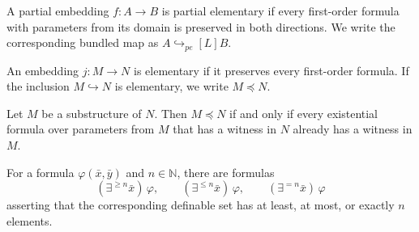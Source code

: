 \begin{definition}
\label{def:partial-elementary-embedding}
\leanok
{}
A partial embedding \(f:A\to B\) is partial elementary if every
first-order formula with parameters from its domain is preserved in
both directions.  We write the corresponding bundled map as
\(A\hookrightarrow_{\!pe}[L] B\).
\end{definition}

\begin{definition}
\label{def:elementary-maps}
\mathlibok
{}
An embedding \(j:M\to N\) is elementary if it preserves every
first-order formula.  If the inclusion \(M\hookrightarrow N\) is
elementary, we write \(M\preceq N\).
\end{definition}

\begin{theorem}
\label{thm:tarski-vaught-test}
\mathlibok
{}
Let \(M\) be a substructure of \(N\).  Then \(M\preceq N\) if and only
if every existential formula over parameters from \(M\) that has a
witness in \(N\) already has a witness in \(M\).
\end{theorem}

\begin{definition}
\label{def:counting-formulas}
\leanok
For a formula \(\varphi(\bar x,\bar y)\) and \(n\in\mathbb N\), there
are formulas
\[
  (\exists^{\geq n}\bar x)\,\varphi,\qquad
  (\exists^{\leq n}\bar x)\,\varphi,\qquad
  (\exists^{=n}\bar x)\,\varphi
\]
asserting that the corresponding definable set has at least, at most, or
exactly \(n\) elements.
\end{definition}


